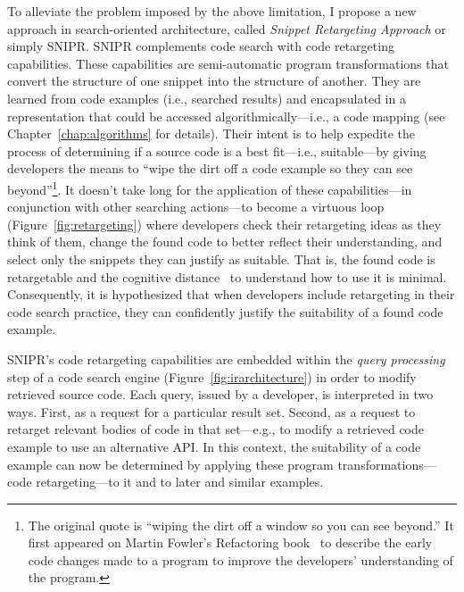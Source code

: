 To alleviate the problem imposed by the above limitation, I propose a new approach in search-oriented architecture, called \emph{Snippet Retargeting Approach} or simply \uppercase{SnipR}. \uppercase{SnipR} complements code search with code retargeting capabilities. These capabilities are semi-automatic program transformations that convert the structure of one snippet into the structure of another. They are learned from code examples (i.e., searched results) and encapsulated in a representation that could be accessed algorithmically---i.e., a code mapping (see Chapter~\ref{chap:algorithms} for details). Their intent is to help expedite the process of determining if a source code is a best fit---i.e., suitable---by giving developers the means to ``wipe the dirt off a code example so they can see beyond''\footnote{The original quote is ``wiping the dirt off a window so you can see beyond.'' It first appeared on Martin Fowler's Refactoring book~\cite{Fowler:1999vp} to describe the early code changes made to a program to improve the developers' understanding of the program.}. It doesn’t take long for the application of these capabilities---in conjunction with other searching actions---to become a virtuous loop (Figure~\ref{fig:retargeting}) where developers check their retargeting ideas as they think of them, change the found code to better reflect their understanding, and select only the snippets they can justify as suitable. That is, the found code is retargetable and the cognitive distance~\cite{Krueger:1992wf} to understand how to use it is minimal. Consequently, it is hypothesized that when developers include retargeting in their code search practice, they can confidently justify the suitability of a found code example.     

\uppercase{SnipR}'s code retargeting capabilities are embedded within the \emph{query processing} step of a code search engine (Figure~\ref{fig:irarchitecture}) in order to modify retrieved source code. Each query, issued by a developer, is interpreted in two ways. First, as a request for a particular result set. Second, as a request to retarget relevant bodies of code in that set---e.g., to modify a retrieved code example to use an alternative API. In this context, the suitability of a code example can now be determined by applying these program transformations---code retargeting---to it and to later and similar examples. 

